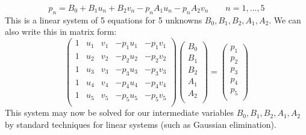 \begin{equation}
 p_n = B_0 + B_1 u_n + B_2 v_n  - p_n A_1 u_n - p_n A_2 v_n \qquad n = 1, \ldots, 5
\end{equation}
This is a linear system of 5 equations for 5 unknowns $B_0, B_1, B_2, A_1, A_2$. We can also write this in matrix form:
\begin{equation}
 \begin{pmatrix}
  1 & u_1 & v_1 & -p_1 u_1 & -p_1 v_1 \\
  1 & u_2 & v_2 & -p_2 u_2 & -p_2 v_2 \\
  1 & u_3 & v_3 & -p_3 u_3 & -p_3 v_3 \\
  1 & u_4 & v_4 & -p_4 u_4 & -p_4 v_4 \\
  1 & u_5 & v_5 & -p_5 u_5 & -p_5 v_5 \\
 \end{pmatrix}
 \begin{pmatrix}
  B_0 \\
  B_1 \\
  B_2 \\
  A_1 \\
  A_2 \\
 \end{pmatrix} 
 = 
 \begin{pmatrix}
  p_1 \\
  p_2 \\
  p_3 \\
  p_4 \\
  p_5 \\
 \end{pmatrix}  
\end{equation}
This system may now be solved for our intermediate variables $B_0, B_1, B_2, A_1, A_2$ by standard techniques for linear systems (such as Gaussian elimination).

